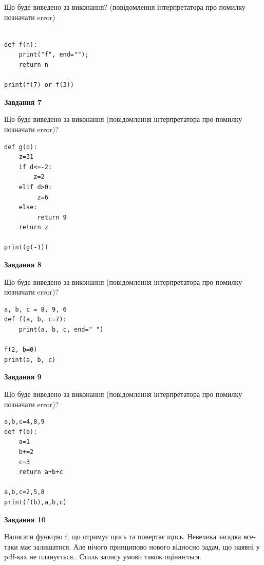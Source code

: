 \documentclass[12pt, ukrainian]{article}
\begin{document}
{\begin {large}
Що буде виведено за виконання? (повідомлення інтерпретатора про помилку позначати error)\par
\begin{verbatim}

def f(n):
    print("f", end="");
    return n

print(f(7) or f(3))
\end{verbatim}

{\begin {center}\textbf{Завдання 7}\end {center}}

Що буде виведено за виконання (повідомлення інтерпретатора про помилку позначати error)?\par
\begin{verbatim}
def g(d):
    z=31
    if d<=-2: 
        z=2
    elif d>0:
         z=6
    else:
         return 9
    return z

print(g(-1))
\end{verbatim}

{\begin {center}\textbf{Завдання 8}\end {center}}

Що буде виведено за виконання (повідомлення інтерпретатора про помилку позначати error)?\par
\begin{verbatim}
a, b, c = 8, 9, 6
def f(a, b, c=7):
    print(a, b, c, end=" ")

f(2, b=0)
print(a, b, c)
\end{verbatim}

{\begin {center}\textbf{Завдання 9}\end {center}}

Що буде виведено за виконання (повідомлення інтерпретатора про помилку позначати error)?\par
\begin{verbatim}
a,b,c=4,8,9
def f(b):
    a=1
    b+=2
    c=3
    return a+b+c

a,b,c=2,5,8
print(f(b),a,b,c)
\end{verbatim}

{\begin {center}\textbf{Завдання 10}\end {center}}


Написати функцiю f, що отримує щось та повертає щось. Невелика загадка все-таки має залишатися. Але нічого принципово нового відносно задач, що наявні у pdf-ках не планується.. Стиль запису умови також оцінюється.\par
\end {large}}
\newpage
\end{document}
